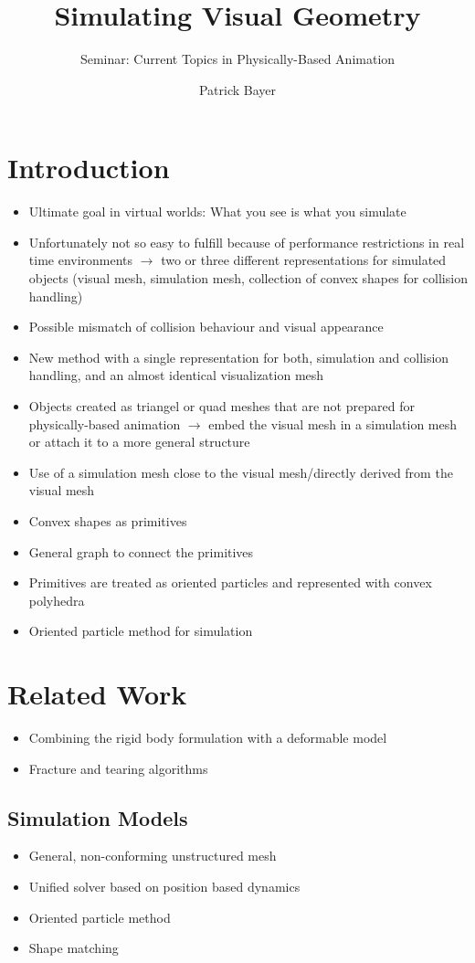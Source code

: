 \documentclass[
	11pt, 
	DIV10,
	a4paper, 
	oneside, 
	headings=normal, 
	captions=tableheading,
	final, 
	numbers=noenddot
]{scrartcl}
\title{Simulating Visual Geometry}
\subtitle{\vspace{0.5cm}Seminar: Current Topics in Physically-Based Animation}
\author{Patrick Bayer}
\begin{document}
\maketitle
\tableofcontents


\section{Introduction}
	\begin{itemize}
		\item Ultimate goal in virtual worlds: What you see is what you simulate
		\item Unfortunately not so easy to fulfill because of performance restrictions in real time environments $\rightarrow$ two or three different representations for simulated objects (visual mesh, simulation mesh, collection of convex shapes for collision handling)
		\item Possible mismatch of collision behaviour and visual appearance
		\item New method with a single representation for both, simulation and collision handling, and an almost identical visualization mesh
		\item Objects created as triangel or quad meshes that are not prepared for physically-based animation $\rightarrow$ embed the visual mesh in a simulation mesh or attach it to a more general structure
		\item Use of a simulation mesh close to the visual mesh/directly derived from the visual mesh
		\item Convex shapes as primitives
		\item General graph to connect the primitives
		\item Primitives are treated as oriented particles and represented with convex polyhedra
		\item Oriented particle method for simulation
	\end{itemize}
\section{Related Work}
	\begin{itemize}
		\item Combining the rigid body formulation with a deformable model
		\item Fracture and tearing algorithms
	\end{itemize}
\subsection{Simulation Models}
	\begin{itemize}
		\item General, non-conforming unstructured mesh
		\item Unified solver based on position based dynamics
		\item Oriented particle method
		\item Shape matching
	\end{itemize}
\end{document}
